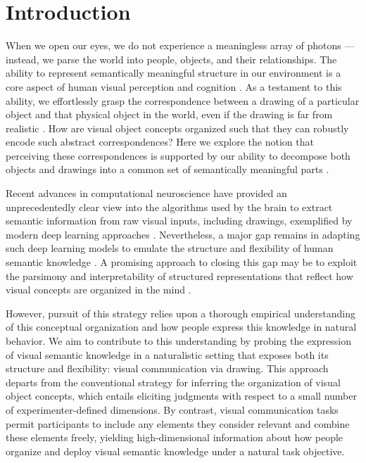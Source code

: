\documentclass[10pt,letterpaper]{article}
\begin{document}
\section{Introduction}


When we open our eyes, we do not experience a meaningless array of photons --- instead, we parse the world into people, objects, and their relationships. 
The ability to represent semantically meaningful structure in our environment is a core aspect of human visual perception and cognition \cite{navon1977forest}. 
As a testament to this ability, we effortlessly grasp the correspondence between a drawing of a particular object and that physical object in the world, even if the drawing is far from realistic \cite{eitz2012humans}. 
How are visual object concepts organized such that they can robustly encode such abstract correspondences?
Here we explore the notion that perceiving these correspondences is supported by our ability to decompose both objects and drawings into a common set of semantically meaningful parts \cite{biederman1988surface}. 

Recent advances in computational neuroscience have provided an unprecedentedly clear view into the algorithms used by the brain to extract semantic information from raw visual inputs, including drawings, exemplified by modern deep learning approaches \cite{FanCommon2018,yamins2014performance}.
Nevertheless, a major gap remains in adapting such deep learning models to emulate the structure and flexibility of human semantic knowledge \cite{lake2017building}.
A promising approach to closing this gap may be to exploit the parsimony and interpretability of structured representations that reflect how visual concepts are organized in the mind \cite{battaglia2018relational}.

However, pursuit of this strategy relies upon a thorough empirical understanding of this conceptual organization and how people express this knowledge in natural behavior. 
We aim to contribute to this understanding by probing the expression of visual semantic knowledge in a naturalistic setting that exposes both its structure and flexibility: visual communication via drawing. 
This approach departs from the conventional strategy for inferring the organization of visual object concepts, which entails eliciting judgments with respect to a small number of experimenter-defined dimensions. 
By contrast, visual communication tasks permit participants to include any elements they consider relevant and combine these elements freely, yielding high-dimensional information about how people organize and deploy visual semantic knowledge under a natural task objective. 
\end{document}
